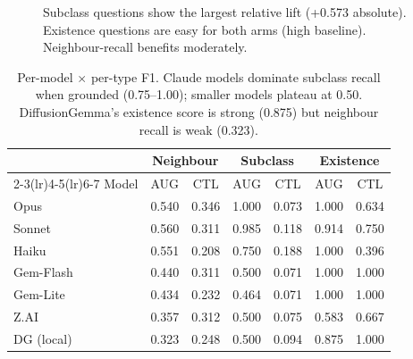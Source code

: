\documentclass[11pt]{article}
\begin{document}
\begin{samepage}
\begin{figure}[h]\centering
{}
\caption{Subclass questions show the largest relative lift (+0.573 absolute). Existence questions
are easy for both arms (high baseline). Neighbour-recall benefits moderately.}
\end{figure}
\end{samepage}

\begin{samepage}
\begin{table}[h]\centering\small
\begin{tabular}{l*{6}{c}}
\toprule
 & \multicolumn{2}{c}{Neighbour} & \multicolumn{2}{c}{Subclass} & \multicolumn{2}{c}{Existence} \\
\cmidrule(lr){2-3}\cmidrule(lr){4-5}\cmidrule(lr){6-7}
Model & AUG & CTL & AUG & CTL & AUG & CTL \\
\midrule
Opus & 0.540 & 0.346 & 1.000 & 0.073 & 1.000 & 0.634 \\
Sonnet & 0.560 & 0.311 & 0.985 & 0.118 & 0.914 & 0.750 \\
Haiku & 0.551 & 0.208 & 0.750 & 0.188 & 1.000 & 0.396 \\
Gem-Flash & 0.440 & 0.311 & 0.500 & 0.071 & 1.000 & 1.000 \\
Gem-Lite & 0.434 & 0.232 & 0.464 & 0.071 & 1.000 & 1.000 \\
Z.AI & 0.357 & 0.312 & 0.500 & 0.075 & 0.583 & 0.667 \\
DG (local) & 0.323 & 0.248 & 0.500 & 0.094 & 0.875 & 1.000 \\
\bottomrule
\end{tabular}
\caption{Per-model $\times$ per-type F1. Claude models dominate subclass recall when grounded
(0.75--1.00); smaller models plateau at 0.50. DiffusionGemma's existence score is strong (0.875)
but neighbour recall is weak (0.323).}
\end{table}
\end{samepage}
\end{document}
